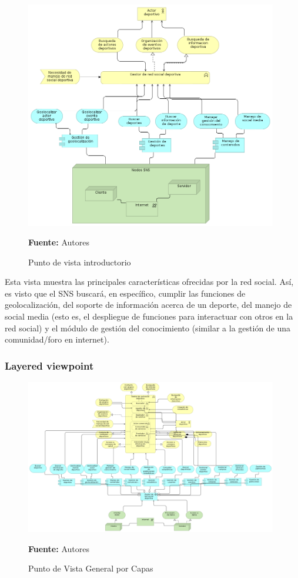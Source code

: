 \begin{figure}[!htb]
  \begin{center}
    \includegraphics[width=11cm]{./imagenes/Archimate/vistas/generales/introductory.png}
    \caption{Punto de vista introductorio}
    \label{fig:introductory}
    \textbf{Fuente:}  Autores
  \end{center}
\end{figure}

Esta vista muestra las principales características ofrecidas por la red social. Así, es visto que el SNS buscará, en específico, cumplir las funciones de geolocalización, del soporte de información acerca de un deporte, del manejo de social media (esto es, el despliegue de funciones para interactuar con otros en la red social) y el módulo de gestión del conocimiento (similar a la gestión de una comunidad/foro en internet).

\subsubsection{Layered viewpoint}

\begin{figure}[!htb]
  \begin{center}
    \includegraphics[width=11cm]{./imagenes/Archimate/vistas/generales/generallayered.png}
    \caption{Punto de Vista General por Capas}
    \label{fig:general_layered}
    \textbf{Fuente:}  Autores
  \end{center}
\end{figure}


